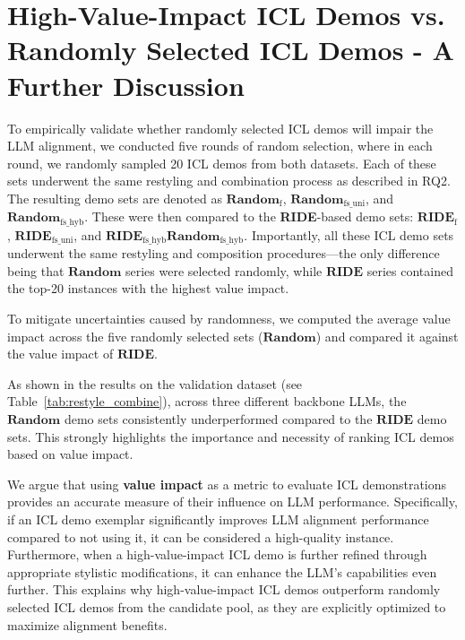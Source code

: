 \section{High-Value-Impact ICL Demos vs. Randomly Selected ICL Demos - A Further Discussion}
\label{appendix:rank_dicsuss}

To empirically validate whether randomly selected ICL demos will impair the LLM alignment, we conducted five rounds of random selection, where in each round, we randomly sampled 20 ICL demos from both datasets. 
Each of these sets underwent the same restyling and combination process as described in RQ2. The resulting demo sets are denoted as $\textbf{Random}_{\text{f}}$, $\textbf{Random}_{\text{fs\_uni}}$, and $\textbf{Random}_{\text{fs\_hyb}}$. 
These were then compared to the \textbf{RIDE}-based demo sets: $\textbf{RIDE}_{\text{f}}$, $\textbf{RIDE}_{\text{fs\_uni}}$, and $\textbf{RIDE}_{\text{fs\_hyb}}$$\textbf{Random}_{\text{fs\_hyb}}$. 
Importantly, all these ICL demo sets underwent the same restyling and composition procedures—the only difference being that $\textbf{Random}$ series were selected randomly, while $\textbf{RIDE}$ series contained the top-20 instances with the highest value impact.

To mitigate uncertainties caused by randomness, we computed the average value impact across the five randomly selected sets ($\textbf{Random}$) and compared it against the value impact of $\textbf{RIDE}$.

As shown in the results on the \dataname{} validation dataset (see Table~\ref{tab:restyle_combine}), across three different backbone LLMs, the $\textbf{Random}$ demo sets consistently underperformed compared to the $\textbf{RIDE}$ demo sets. This strongly highlights the importance and necessity of ranking ICL demos based on value impact.

We argue that using \textbf{value impact} as a metric to evaluate ICL demonstrations provides an accurate measure of their influence on LLM performance. Specifically, if an ICL demo exemplar significantly improves LLM alignment performance compared to not using it, it can be considered a high-quality instance.
Furthermore, when a high-value-impact ICL demo is further refined through appropriate stylistic modifications, it can enhance the LLM’s capabilities even further. This explains why high-value-impact ICL demos outperform randomly selected ICL demos from the candidate pool, as they are explicitly optimized to maximize alignment benefits.
